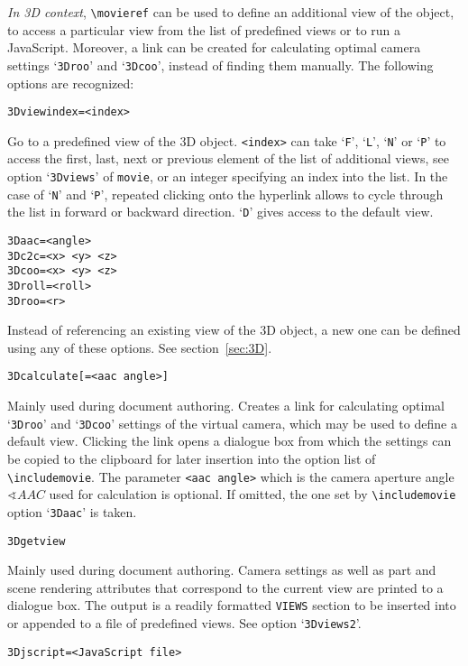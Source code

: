 \documentclass[a4paper]{article}
\begin{document}
\emph{In 3D context}, \verb+\movieref+ can be used to define an additional view of the object, to access a particular view from the list of predefined views or to run a JavaScript. Moreover, a link can be created for calculating optimal camera settings `\verb+3Droo+' and `\verb+3Dcoo+', instead of finding them manually. The following options are recognized:
\begin{verbatim}
3Dviewindex=<index>
\end{verbatim}
Go to a predefined view of the 3D object. \verb+<index>+ can take `\verb+F+', `\verb+L+', `\verb+N+' or `\verb+P+' to access the first, last, next or previous element of the list of additional views, see option `\verb+3Dviews+' of {\tt \string\-movie}, or an integer specifying an index into the list. In the case of `\verb+N+' and `\verb+P+', repeated clicking onto the hyperlink allows to cycle through the list in forward or backward direction. `\verb+D+' gives access to the default view.
\begin{verbatim}
3Daac=<angle>
3Dc2c=<x> <y> <z>
3Dcoo=<x> <y> <z>
3Droll=<roll>
3Droo=<r>
\end{verbatim}
Instead of referencing an existing view of the 3D object, a new one can be defined using any of these options. See section~\ref{sec:3D}.
\begin{verbatim}
3Dcalculate[=<aac angle>]
\end{verbatim}
Mainly used during document authoring. Creates a link for calculating optimal `\verb+3Droo+' and `\verb+3Dcoo+' settings of the virtual camera, which may be used to define a default view. Clicking the link opens a dialogue box from which the settings can be copied to the clipboard for later insertion into the option list of \verb+\includemovie+. The parameter \verb+<aac angle>+ which is the camera aperture angle $\sphericalangle AAC$ used for calculation is optional. If omitted, the one set by \verb+\includemovie+ option `\verb+3Daac+' is taken.
\begin{verbatim}
3Dgetview
\end{verbatim}
Mainly used during document authoring. Camera settings as well as part and scene rendering attributes that correspond to the current view are printed to a dialogue box. The output is a readily formatted \verb+VIEWS+ section to be inserted into or appended to a file of predefined views. See option `\verb+3Dviews2+'.
\begin{verbatim}
3Djscript=<JavaScript file>
\end{verbatim}
\end{document}
